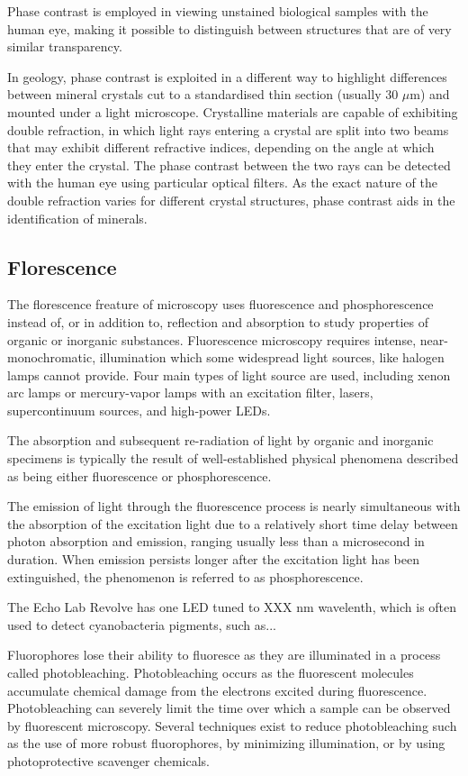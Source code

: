 \documentclass[12pt]{../SOP2}
\begin{document}
\NP Phase contrast is employed in viewing unstained biological samples with the human eye, making it possible to distinguish between structures that are of very similar transparency.

\NP In geology, phase contrast is exploited in a different way to highlight differences between mineral crystals cut to a standardised thin section (usually 30 $\mu$m) and mounted under a light microscope. Crystalline materials are capable of exhibiting double refraction, in which light rays entering a crystal are split into two beams that may exhibit different refractive indices, depending on the angle at which they enter the crystal. The phase contrast between the two rays can be detected with the human eye using particular optical filters. As the exact nature of the double refraction varies for different crystal structures, phase contrast aids in the identification of minerals.

\subsection*{Florescence}

\NP The florescence freature of microscopy uses fluorescence and phosphorescence instead of, or in addition to, reflection and absorption to study properties of organic or inorganic substances. 
\NP Fluorescence microscopy requires intense, near-monochromatic, illumination which some widespread light sources, like halogen lamps cannot provide. Four main types of light source are used, including xenon arc lamps or mercury-vapor lamps with an excitation filter, lasers, supercontinuum sources, and high-power LEDs. 

\NP The absorption and subsequent re-radiation of light by organic and inorganic specimens is typically the result of well-established physical phenomena described as being either fluorescence or phosphorescence. 

\NP The emission of light through the fluorescence process is nearly simultaneous with the absorption of the excitation light due to a relatively short time delay between photon absorption and emission, ranging usually less than a microsecond in duration. When emission persists longer after the excitation light has been extinguished, the phenomenon is referred to as phosphorescence.

\NP The Echo Lab Revolve has one LED tuned to XXX nm wavelenth, which is often used to detect cyanobacteria pigments, such as...


\NP Fluorophores lose their ability to fluoresce as they are illuminated in a process called photobleaching. Photobleaching occurs as the fluorescent molecules accumulate chemical damage from the electrons excited during fluorescence. Photobleaching can severely limit the time over which a sample can be observed by fluorescent microscopy. Several techniques exist to reduce photobleaching such as the use of more robust fluorophores, by minimizing illumination, or by using photoprotective scavenger chemicals.
\end{document}
